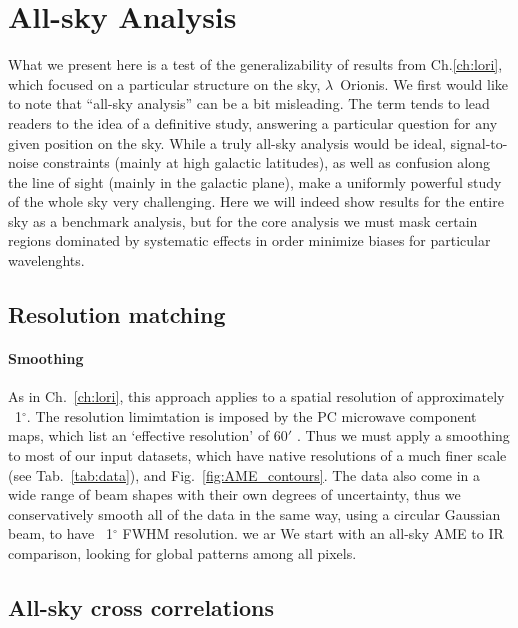 \chapter{All-sky Analysis}
  \label{sec:analysis}
    What we present here is a test of the generalizability of results from Ch.\ref{ch:lori}, which focused on a particular structure on the sky, $\lambda$~Orionis.
    We first would like to note that ``all-sky analysis'' can be a bit misleading. The term tends to lead readers to the idea of a definitive study, answering a particular question for any given position on the sky.  While a truly all-sky analysis would be ideal, signal-to-noise constraints (mainly at high galactic latitudes), as well as confusion along the line of sight (mainly in the galactic plane), make a uniformly powerful study of the whole sky very challenging. Here we will indeed show results for the entire sky as a benchmark analysis, but for the core analysis we must mask certain regions dominated by systematic effects in order minimize biases for particular wavelenghts.

\section{Resolution matching}
    \subsubsection{Smoothing}
        As in Ch.~\ref{ch:lori}, this approach applies to a spatial resolution of approximately ~1$^{\circ}$. The resolution limimtation is imposed by the PC microwave component maps, which list an `effective resolution' of 60$'$ \citep{planck15X}. Thus we must apply a smoothing to most of our input datasets, which have native resolutions of a much finer scale (see Tab.~\ref{tab:data}), and Fig.~\ref{fig:AME_contours}. The data also come in a wide range of beam shapes with their own degrees of uncertainty, thus we conservatively smooth all of the data in the same way, using a circular Gaussian beam, to have ~1$^{\circ}$ FWHM resolution. we ar We start with an all-sky AME to IR comparison, looking for global patterns among all pixels.


  \section{All-sky cross correlations}

